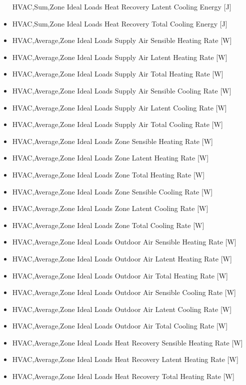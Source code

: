 \begin{itemize}
  HVAC,Sum,Zone Ideal Loads Heat Recovery Latent Cooling Energy {[}J{]}
\item
  HVAC,Sum,Zone Ideal Loads Heat Recovery Total Cooling Energy {[}J{]}
\item
  HVAC,Average,Zone Ideal Loads Supply Air Sensible Heating Rate {[}W{]}
\item
  HVAC,Average,Zone Ideal Loads Supply Air Latent Heating Rate {[}W{]}
\item
  HVAC,Average,Zone Ideal Loads Supply Air Total Heating Rate {[}W{]}
\item
  HVAC,Average,Zone Ideal Loads Supply Air Sensible Cooling Rate {[}W{]}
\item
  HVAC,Average,Zone Ideal Loads Supply Air Latent Cooling Rate {[}W{]}
\item
  HVAC,Average,Zone Ideal Loads Supply Air Total Cooling Rate {[}W{]}
\item
  HVAC,Average,Zone Ideal Loads Zone Sensible Heating Rate {[}W{]}
\item
  HVAC,Average,Zone Ideal Loads Zone Latent Heating Rate {[}W{]}
\item
  HVAC,Average,Zone Ideal Loads Zone Total Heating Rate {[}W{]}
\item
  HVAC,Average,Zone Ideal Loads Zone Sensible Cooling Rate {[}W{]}
\item
  HVAC,Average,Zone Ideal Loads Zone Latent Cooling Rate {[}W{]}
\item
  HVAC,Average,Zone Ideal Loads Zone Total Cooling Rate {[}W{]}
\item
  HVAC,Average,Zone Ideal Loads Outdoor Air Sensible Heating Rate {[}W{]}
\item
  HVAC,Average,Zone Ideal Loads Outdoor Air Latent Heating Rate {[}W{]}
\item
  HVAC,Average,Zone Ideal Loads Outdoor Air Total Heating Rate {[}W{]}
\item
  HVAC,Average,Zone Ideal Loads Outdoor Air Sensible Cooling Rate {[}W{]}
\item
  HVAC,Average,Zone Ideal Loads Outdoor Air Latent Cooling Rate {[}W{]}
\item
  HVAC,Average,Zone Ideal Loads Outdoor Air Total Cooling Rate {[}W{]}
\item
  HVAC,Average,Zone Ideal Loads Heat Recovery Sensible Heating Rate {[}W{]}
\item
  HVAC,Average,Zone Ideal Loads Heat Recovery Latent Heating Rate {[}W{]}
\item
  HVAC,Average,Zone Ideal Loads Heat Recovery Total Heating Rate {[}W{]}

\end{itemize}
